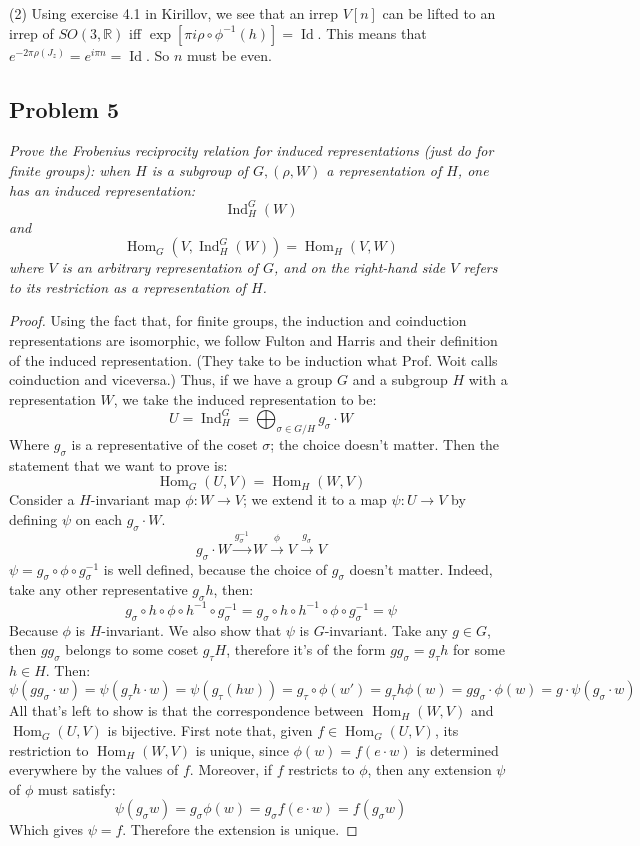 \documentclass[12 pt]{article}
\newcommand{\R}{\mathbb{R}}
\DeclareMathOperator{\Ind}{Ind}
\DeclareMathOperator{\Hom}{Hom}
\DeclareMathOperator{\id}{Id}
\begin{document}
(2) Using exercise 4.1 in Kirillov, we see that an irrep $V[n]$ can be lifted to an irrep of $SO(3,\R)$ iff $\exp[\pi i \rho \circ \phi^{-1} (h)] = \id$. This means that $e^{-2 \pi \rho (J_z)} = e^{i \pi n} = \id$. So $n$ must be even.


\subsection*{Problem 5}
\emph{Prove the Frobenius reciprocity relation for induced representations (just do for finite groups): when $H$ is a subgroup of $G, (\rho, W)$ a representation of $H$, one has an induced representation:
\[       \Ind^G_H(W)  \]
and
\[        \Hom_G(V, \Ind^G_H(W)) = \Hom_H(V, W)    \]
where $V$ is an arbitrary representation of $G$, and on the right-hand side $V$ refers to its restriction as a representation of $H$.}

\begin{proof}
Using the fact that, for finite groups, the induction and coinduction representations are isomorphic, we follow Fulton and Harris and their definition of the induced representation. (They take to be induction what Prof. Woit calls coinduction and viceversa.) Thus, if we have a group $G$ and a subgroup $H$ with a representation $W$, we take the induced representation to be:
\[      U = \Ind_H^G = \bigoplus_{\sigma \in G/H} g_{\sigma} \cdot W     \]
Where $g_{\sigma}$ is a representative of the coset $\sigma$; the choice doesn't matter. Then the statement that we want to prove is:
\[      \Hom_G(U, V) = \Hom_H(W, V)    \]
Consider a $H$-invariant map $\phi : W \to V$; we extend it to a map $\psi: U \to V$ by defining $\psi$ on each $g_{\sigma} \cdot W$.
\[       g_{\sigma} \cdot W \overset{g_{\sigma}^{-1}}{\to} W \overset{\phi}{\to} V \overset{g_{\sigma}}{\to} V      \]
$\psi = g_{\sigma} \circ \phi \circ g_{\sigma}^{-1}$ is well defined, because the choice of $g_{\sigma}$ doesn't matter. Indeed, take any other representative $g_{\sigma}h$, then:
 \[     g_{\sigma} \circ h \circ \phi \circ h^{-1} \circ  g_{\sigma}^{-1} =    g_{\sigma} \circ h \circ h^{-1} \circ \phi \circ  g_{\sigma}^{-1}  = \psi    \]
Because $\phi$ is $H$-invariant. We also show that $\psi$ is $G$-invariant. Take any $g \in G$, then $gg_{\sigma}$ belongs to some coset $g_{\tau} H$, therefore it's of the form $gg_{\sigma} = g_{\tau} h$ for some $h\in H$. Then:
\[         \psi(gg_{\sigma} \cdot w) = \psi(g_{\tau}h \cdot w) = \psi(g_{\tau} (hw)) = g_{\tau} \circ \phi(w') = g_{\tau} h \phi(w) = gg_{\sigma} \cdot \phi(w) = g\cdot \psi(g_{\sigma} \cdot w)     \]
All that's left to show is that the correspondence between $\Hom_H(W, V)$ and $\Hom_G(U, V)$ is bijective. First note that, given $f \in \Hom_G(U, V)$, its restriction to $\Hom_H(W, V)$ is unique, since $\phi(w) = f(e\cdot w)$ is determined everywhere by the values of $f$. Moreover, if $f$ restricts to $\phi$, then any extension $\psi$ of $\phi$ must satisfy:
\[    \psi(g_{\sigma} w) = g_{\sigma} \phi(w) = g_{\sigma} f(e\cdot w) = f(g_{\sigma} w)     \]
Which gives $\psi = f$. Therefore the extension is unique.
\end{proof}
\end{document}
